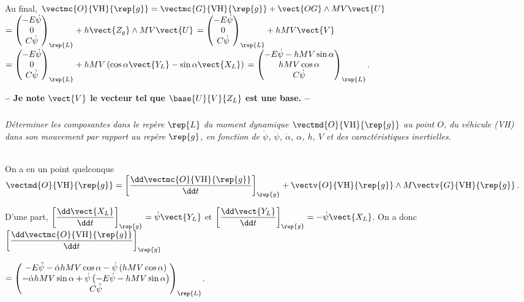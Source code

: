 \begin{multicols}{2}
\begin{corrige}
Au final, 
$\vectmc{O}{\text{VH}}{\rep{g}} =\vectmc{G}{\text{VH}}{\rep{g}} +\vect{OG}\wedge MV\vect{U}$
$ = \begin{pmatrix} -E\dot{\psi} \\ 0 \\ C\dot{\psi} \end{pmatrix}_{\rep{L}} + h\vect{Z_g} \wedge MV\vect{U}$ 
$ = \begin{pmatrix} -E\dot{\psi} \\ 0 \\ C\dot{\psi} \end{pmatrix}_{\rep{L}} + hMV\vect{V}$ 
$ = \begin{pmatrix} -E\dot{\psi} \\ 0 \\ C\dot{\psi} \end{pmatrix}_{\rep{L}} + hMV\left(\cos\alpha \vect{Y_L} - \sin\alpha \vect{X_L} \right)$ 
$ = \begin{pmatrix} -E\dot{\psi} - hMV \sin\alpha \\ hMV\cos\alpha \\ C\dot{\psi} \end{pmatrix}_{\rep{L}} $.

\textbf{ -- Je note $\vect{V}$ le vecteur tel que $\base{U}{V}{Z_L}$ est une base. --}
\end{corrige}
\else
\fi

\subparagraph{}\textit{Déterminer les composantes dans le repère $\rep{L}$ du moment dynamique
$\vectmd{O}{\text{VH}}{\rep{g}}$
au point $O$, du véhicule (VH) dans son mouvement par rapport au
repère $\rep{g}$, en fonction de $\dot{\psi}$, $\ddot{\psi}$, $\dot{\alpha}$, $\alpha$, $h$, $V$ et des caractéristiques inertielles.
}\ifprof
\begin{corrige} ~\\

On a en un point quelconque
 $\vectmd{O}{\text{VH}}{\rep{g}} =\left[ \dfrac{\dd \vectmc{O}{\text{VH}}{\rep{g}}}{\dd t}\right]_{\rep{g}}+\vectv{O}{\text{VH}}{\rep{g}} \wedge M\vectv{G}{\text{VH}}{\rep{g}}$.
 
 D'une part, $\left[ \dfrac{\dd \vect{X_L} }{\dd t}\right]_{\rep{g}} = \dot{\psi}\vect{Y_L}$ et $\left[ \dfrac{\dd \vect{Y_L} }{\dd t}\right]_{\rep{g}} = -\dot{\psi}\vect{X_L}$. On a donc 
 $\left[ \dfrac{\dd \vectmc{O}{\text{VH}}{\rep{g}}}{\dd t}\right]_{\rep{g}} $ 
 
 $ = 
  \begin{pmatrix} 
  -E\ddot{\psi} - \dot{\alpha} hMV \cos\alpha - \dot{\psi}\left( hMV\cos\alpha\right)\\ 
  -\dot{\alpha} hMV\sin\alpha +\dot{\psi}\left( -E\dot{\psi} -  hMV \sin\alpha\right)\\ 
  C\ddot{\psi} \end{pmatrix}_{\rep{L}} 
  $.
  

\end{corrige}
\end{multicols}
